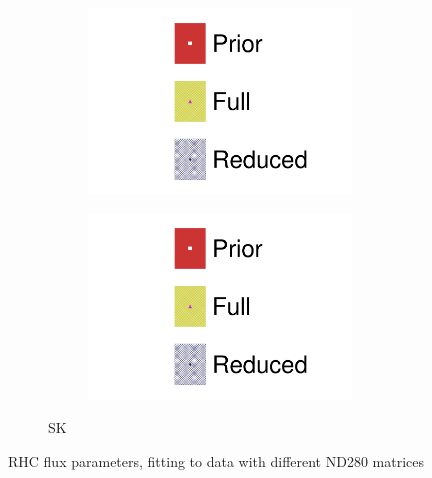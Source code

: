 \begin{figure}[h]
\begin{subfigure}[t]{\textwidth}
\begin{subfigure}[t]{0.24\textwidth}
		\includegraphics[width=\textwidth,page=16, trim={0mm 0mm 0mm 9mm}, clip]{figures/mach3/2018/data/2018a_FixedCov_FullCov_Mpi_Data_merg_2018a_FixedCov_RedCov_Mpi_Data_merge}
	\end{subfigure}
	\begin{subfigure}[t]{0.24\textwidth}
		\includegraphics[width=\textwidth,page=17, trim={0mm 0mm 0mm 9mm}, clip]{figures/mach3/2018/data/2018a_FixedCov_FullCov_Mpi_Data_merg_2018a_FixedCov_RedCov_Mpi_Data_merge}
	\end{subfigure}
\caption{SK}
\end{subfigure}
	\caption{RHC flux parameters, fitting to data with different ND280 matrices}
	\label{fig:data_full_red_rhc}
\end{figure}

